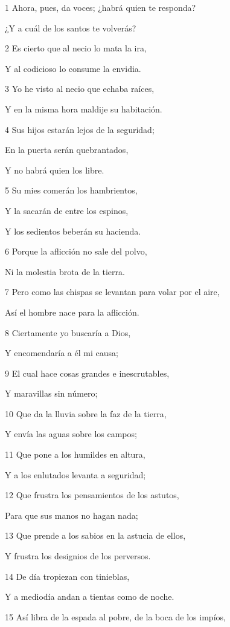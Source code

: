 \par 1 Ahora, pues, da voces; ¿habrá quien te responda?
\par ¿Y a cuál de los santos te volverás?
\par 2 Es cierto que al necio lo mata la ira,
\par Y al codicioso lo consume la envidia.
\par 3 Yo he visto al necio que echaba raíces,
\par Y en la misma hora maldije su habitación.
\par 4 Sus hijos estarán lejos de la seguridad;
\par En la puerta serán quebrantados,
\par Y no habrá quien los libre.
\par 5 Su mies comerán los hambrientos,
\par Y la sacarán de entre los espinos,
\par Y los sedientos beberán su hacienda.
\par 6 Porque la aflicción no sale del polvo,
\par Ni la molestia brota de la tierra.
\par 7 Pero como las chispas se levantan para volar por el aire,
\par Así el hombre nace para la aflicción.
\par 8 Ciertamente yo buscaría a Dios,
\par Y encomendaría a él mi causa;
\par 9 El cual hace cosas grandes e inescrutables,
\par Y maravillas sin número;
\par 10 Que da la lluvia sobre la faz de la tierra,
\par Y envía las aguas sobre los campos;
\par 11 Que pone a los humildes en altura,
\par Y a los enlutados levanta a seguridad;
\par 12 Que frustra los pensamientos de los astutos,
\par Para que sus manos no hagan nada;
\par 13 Que prende a los sabios en la astucia de ellos, 
\par Y frustra los designios de los perversos.
\par 14 De día tropiezan con tinieblas,
\par Y a mediodía andan a tientas como de noche.
\par 15 Así libra de la espada al pobre, de la boca de los impíos,
